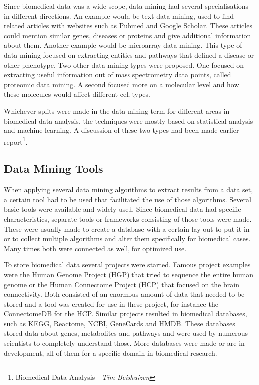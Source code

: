 \documentclass[10pt,a4paper]{article}
\begin{document}
	Since biomedical data was a wide scope, data mining had several specialisations in different directions. An example would be text data mining, used to find related articles with websites such as Pubmed and Google Scholar. These articles could mention similar genes, diseases or proteins and give additional information about them. Another example would be microarray data mining. This type of data mining focused on extracting entities and pathways that defined a disease or other phenotype. Two other data mining types were proposed. One focused on extracting useful information out of mass spectrometry data points, called proteomic data mining. A second focused more on a molecular level and how these molecules would affect different cell types.\cite{YANG2012S16}
	
	Whichever splits were made in the data mining term for different areas in biomedical data analysis, the techniques were mostly based on statistical analysis and machine learning. A discussion of these two types had been made earlier report\footnote{\label{fn:BDA}Biomedical Data Analysis - \textit{Tim Beishuizen}}.
	
	\subsection{Data Mining Tools}
	\label{subsec:DataMiningTools}
	
	When applying several data mining algorithms to extract results from a data set, a certain tool had to be used that facilitated the use of those algorithms. Several basic tools were available and widely used. Since biomedical data had specific characteristics, separate tools or frameworks consisting of those tools were made. These were usually made to create a database with a certain lay-out to put it in or to collect multiple algorithms and alter them specifically for biomedical cases. Many times both were connected as well, for optimized use.
	
	To store biomedical data several projects were started. Famous project examples were the Human Genome Project (HGP) that tried to sequence the entire human genome\cite{sawicki1993human} or the Human Connectome Project (HCP) that focused on the brain connectivity.\cite{van2012human} Both consisted of an enormous amount of data that needed to be stored and a tool was created for use in these project, for instance the ConnectomeDB for the HCP.\cite{marcus2011informatics} Similar projects resulted in biomedical databases, such as KEGG\cite{kanehisa2000kegg}, Reactome\cite{joshi2005reactome}, NCBI\cite{edgar2002gene}, GeneCards\cite{safran2010genecards} and HMDB\cite{wishart2007hmdb}. These databases stored data about genes, metabolites and pathways and were used by numerous scientists to completely understand those. More databases were made or are in development, all of them for a specific domain in biomedical research.
	
\end{document}
